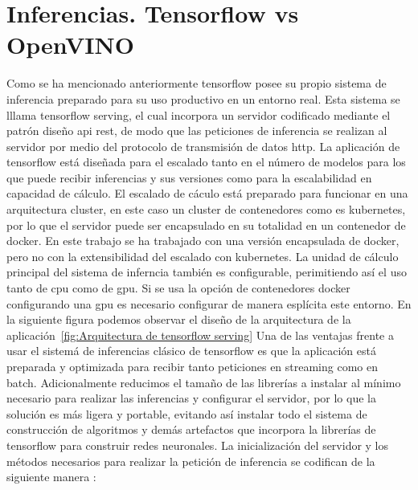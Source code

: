 \section{Inferencias. Tensorflow vs OpenVINO}\label{sec:inferencias.-tensorflow-vs-openvino}
Como se ha mencionado anteriormente tensorflow posee su propio sistema de inferencia preparado para su uso productivo en un entorno real.
Esta sistema se lllama tensorflow serving, el cual incorpora un servidor codificado mediante el patrón diseño api rest, de modo que las peticiones
de inferencia se realizan al servidor por medio del protocolo de transmisión de datos http.
La aplicación de tensorflow está diseñada para el escalado tanto en el número de modelos para los que puede recibir inferencias y sus versiones como para la escalabilidad en capacidad de cálculo.
El escalado de cáculo está preparado para funcionar en una arquitectura cluster, en este caso un cluster de contenedores como es kubernetes, por lo que el servidor puede ser
encapsulado en su totalidad en un contenedor de docker.
En este trabajo se ha trabajado con una versión encapsulada de docker, pero no con la extensibilidad del escalado con kubernetes.
La unidad de cálculo principal del sistema de inferncia también es configurable, perimitiendo así el uso tanto de cpu como de gpu.
Si se usa la opción de contenedores docker configurando una gpu es necesario configurar de manera esplícita este entorno.
En la siguiente figura podemos observar el diseño de la arquitectura de la aplicación~\ref{fig:Arquitectura de tensorflow serving}
Una de las ventajas frente a usar el sistemá de inferencias clásico de tensorflow es que la aplicación está preparada y optimizada para recibir tanto peticiones en streaming como en batch.
Adicionalmente reducimos el tamaño de las librerías a instalar al mínimo necesario para realizar las inferencias y configurar el servidor, por lo que la solución es más ligera y portable, evitando así
instalar todo el sistema de construcción de algoritmos y demás artefactos que incorpora la librerías de tensorflow para construir redes neuronales.
La inicialización del servidor y los métodos necesarios para realizar la petición de inferencia se codifican de la siguiente manera :

